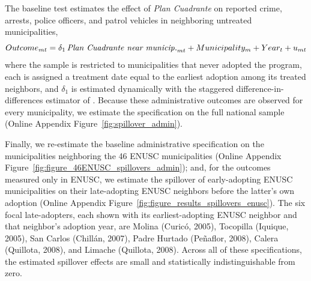The baseline test estimates the effect of \emph{Plan Cuadrante} on reported crime, arrests, police officers, and patrol vehicles in neighboring untreated municipalities,
\begin{equation}
Outcome_{mt}= \delta_{1}\,\mbox{\textit{Plan Cuadrante near municip.}}_{mt} + Municipality_{m} + Year_{t} + u_{mt}
\label{eq:main3}
\end{equation}
\noindent where the sample is restricted to municipalities that never adopted the program, each is assigned a treatment date equal to the earliest adoption among its treated neighbors, and $\delta_{1}$ is estimated dynamically with the staggered difference-in-differences estimator of \citet{Callaway}. Because these administrative outcomes are observed for every municipality, we estimate the specification on the full national sample (Online Appendix Figure~\ref{fig:spillover_admin}).

Finally, we re-estimate the baseline administrative specification on the municipalities neighboring the 46 ENUSC municipalities (Online Appendix Figure~\ref{fig:figure_46ENUSC_spillovers_admin}); and, for the outcomes measured only in ENUSC, we estimate the spillover of early-adopting ENUSC municipalities on their late-adopting ENUSC neighbors before the latter's own adoption (Online Appendix Figure~\ref{fig:figure_results_spillovers_enusc}). The six focal late-adopters, each shown with its earliest-adopting ENUSC neighbor and that neighbor's adoption year, are Molina (Curic\'o, 2005), Tocopilla (Iquique, 2005), San Carlos (Chill\'an, 2007), Padre Hurtado (Pe\~naflor, 2008), Calera (Quillota, 2008), and Limache (Quillota, 2008). Across all of these specifications, the estimated spillover effects are small and statistically indistinguishable from zero.


\clearpage


\clearpage


\clearpage
